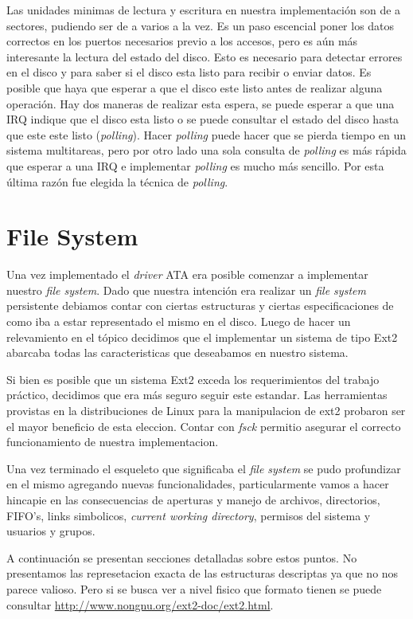 \documentclass[a4paper,10pt]{article}
\begin{document}
    Las unidades minimas de lectura y escritura en nuestra implementación son de a sectores, pudiendo ser de a
    varios a la vez. Es un paso escencial poner los datos correctos en los puertos necesarios previo a los accesos, pero
    es aún más interesante la lectura del estado del disco. Esto es necesario para detectar errores en el disco
    y para saber si el disco esta listo para recibir o enviar datos. Es posible que haya que esperar a que el disco
    este listo antes de realizar alguna operación. Hay dos maneras de realizar esta espera, se puede esperar a que una IRQ
    indique que el disco esta listo o se puede consultar el estado del disco hasta que este este listo (\textit{polling}).
    Hacer \textit{polling} puede hacer que se pierda tiempo en un sistema multitareas, pero por otro lado una sola
    consulta de \textit{polling} es más rápida que esperar a una IRQ e implementar \textit{polling} es mucho más sencillo.
    Por esta última razón fue elegida la técnica de \textit{polling}.
\newpage
\section{File System}
    
Una vez implementado el \textit{driver} ATA era posible comenzar a implementar nuestro \textit{file system}.
Dado que nuestra intención era realizar un \textit{file system} persistente debiamos contar con ciertas estructuras
y ciertas especificaciones de como iba a estar representado el mismo en el disco. Luego de hacer un relevamiento
en el tópico decidimos que el implementar un sistema de tipo Ext2 abarcaba todas las caracteristicas que deseabamos
en nuestro sistema. 

Si bien es posible que un sistema Ext2 exceda los requerimientos del trabajo práctico, decidimos que era más seguro seguir este estandar. 
Las herramientas provistas en la distribuciones de Linux para la manipulacion de ext2 probaron ser el mayor beneficio de esta eleccion.
Contar con \textit{fsck} permitio asegurar el correcto funcionamiento de nuestra implementacion.

Una vez terminado el esqueleto que significaba el \textit{file system} se pudo profundizar en el mismo agregando
nuevas funcionalidades, particularmente vamos a hacer hincapie en las consecuencias de aperturas y manejo de
archivos, directorios, FIFO's, links simbolicos, \textit{current working
directory}, permisos del sistema y usuarios y grupos.

A continuación se presentan secciones detalladas sobre estos puntos.
No presentamos las represetacion exacta de las estructuras descriptas ya que no nos parece valioso.
Pero si se busca ver a nivel fisico que formato tienen se puede consultar \url{http://www.nongnu.org/ext2-doc/ext2.html}.
\end{document}
